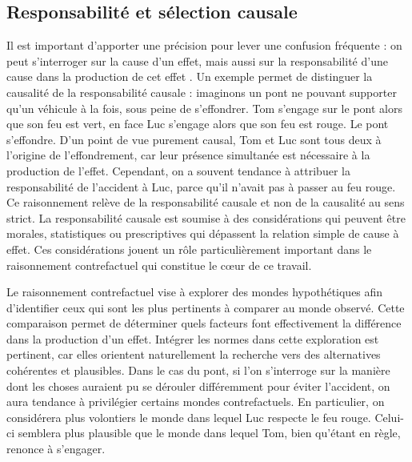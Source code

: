 \subsection{Responsabilité et sélection causale}

Il est important d'apporter une précision pour lever une confusion fréquente : on peut s'interroger sur la cause d'un effet, mais aussi sur la responsabilité d'une cause dans la production de cet effet \parencite{hart1978honore}. Un exemple permet de distinguer la causalité de la responsabilité causale : imaginons un pont ne pouvant supporter qu'un véhicule à la fois, sous peine de s'effondrer. Tom s'engage sur le pont alors que son feu est vert, en face Luc s'engage alors que son feu est rouge. Le pont s'effondre. D'un point de vue purement causal, Tom et Luc sont tous deux à l'origine de l'effondrement, car leur présence simultanée est nécessaire à la production de l'effet. Cependant, on a souvent tendance à attribuer la responsabilité de l'accident à Luc, parce qu'il n'avait pas à passer au feu rouge. Ce raisonnement relève de la responsabilité causale et non de la causalité au sens strict. La responsabilité causale est soumise à des considérations qui peuvent être morales, statistiques ou prescriptives qui dépassent la relation simple de cause à effet. Ces considérations jouent un rôle particulièrement important dans le raisonnement contrefactuel qui constitue le cœur de ce travail.

Le raisonnement contrefactuel vise à explorer des mondes hypothétiques afin d'identifier ceux qui sont les plus pertinents à comparer au monde observé. Cette comparaison permet de déterminer quels facteurs font effectivement la différence dans la production d'un effet. Intégrer les normes dans cette exploration est pertinent, car elles orientent naturellement la recherche vers des alternatives cohérentes et plausibles. Dans le cas du pont, si l'on s'interroge sur la manière dont les choses auraient pu se dérouler différemment pour éviter l'accident, on aura tendance à privilégier certains mondes contrefactuels. En particulier, on considérera plus volontiers le monde dans lequel Luc respecte le feu rouge. Celui-ci semblera plus plausible que le monde dans lequel Tom, bien qu'étant en règle, renonce à s'engager.

